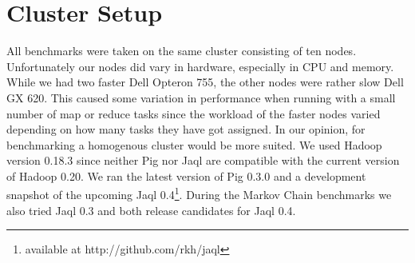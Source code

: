 \section{Cluster Setup}

All benchmarks were taken on the same cluster consisting of ten nodes. Unfortunately our nodes did vary in hardware, especially in CPU and
memory. While we had two faster Dell Opteron 755, the other nodes were rather slow Dell GX 620. This caused some variation in performance
when running with a small number of map or reduce tasks since the workload of the faster nodes varied depending on how many tasks they
have got assigned. In our opinion, for benchmarking a homogenous cluster would be more suited. We used Hadoop version 0.18.3 since neither
Pig nor Jaql are compatible with the current version of Hadoop 0.20. We ran the latest version of Pig 0.3.0 and a development snapshot of
the upcoming Jaql 0.4\footnote{available at http://github.com/rkh/jaql}. During the Markov Chain benchmarks we also tried Jaql 0.3 and
both release candidates for Jaql 0.4.